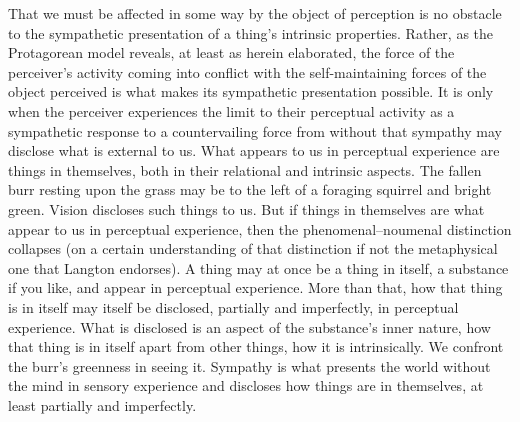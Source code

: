 That we must be affected in some way by the object of perception is no obstacle to the sympathetic presentation of a thing's intrinsic properties. Rather, as the Protagorean model reveals, at least as herein elaborated, the force of the perceiver's activity coming into conflict with the self-maintaining forces of the object perceived is what makes its sympathetic presentation possible. It is only when the perceiver experiences the limit to their perceptual activity as a sympathetic response to a countervailing force from without that sympathy may disclose what is external to us. What appears to us in perceptual experience are things in themselves, both in their relational and intrinsic aspects. The fallen burr resting upon the grass may be to the left of a foraging squirrel and bright green. Vision discloses such things to us. But if things in themselves are what appear to us in perceptual experience, then the phenomenal--noumenal distinction collapses (on a certain understanding of that distinction if not the metaphysical one that Langton endorses). A thing may at once be a thing in itself, a substance if you like, and appear in perceptual experience. More than that, how that thing is in itself may itself be disclosed, partially and imperfectly, in perceptual experience. What is disclosed is an aspect of the substance's inner nature, how that thing is in itself apart from other things, how it is intrinsically. We confront the burr's greenness in seeing it. Sympathy is what presents the world without the mind in sensory experience and discloses how things are in themselves, at least partially and imperfectly.


